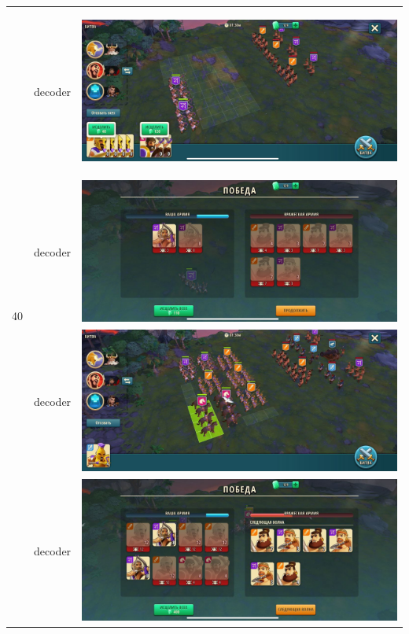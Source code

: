 \begin{longtable}{|c|c|c|}
    \hline
    \multirow{4}{*}{40} & decoder &
    \hypertarget{fight40}{\includegraphics[width=0.75\linewidth]{./parts/media/TreasureHunt/40/decoder/photo_2022-04-07_13-16-12.jpg}} \\
    & decoder &
    \includegraphics[width=0.75\linewidth]{./parts/media/TreasureHunt/40/decoder/photo_2022-04-07_13-16-15.jpg} \\
    & decoder &
    \includegraphics[width=0.75\linewidth]{./parts/media/TreasureHunt/40/decoder/photo_2022-04-07_13-15-51.jpg} \\
    & decoder &
    \includegraphics[width=0.75\linewidth]{./parts/media/TreasureHunt/40/decoder/photo_2022-04-07_13-16-08.jpg} \\
    \hline
\end{longtable}
